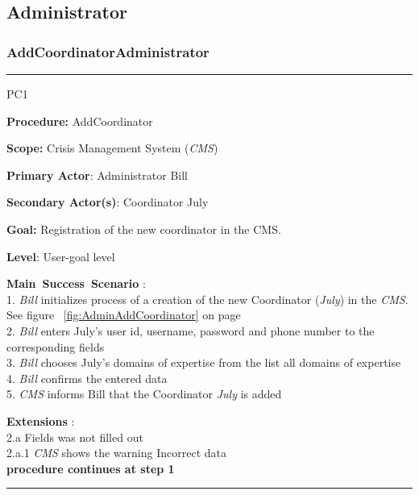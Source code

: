 \subsection{Administrator}

\subsubsection{AddCoordinatorAdministrator}

\vspace{0.5cm}
\hrule
\begin{lyxlist}{PC1}
\small{
\item [\textbf{Procedure:}] AddCoordinator
\item [\textbf{Scope:}] Crisis Management System (\emph{CMS})
\item [\textbf{Primary Actor}:] Administrator Bill
\item [\textbf{Secondary Actor(s)}:] Coordinator July
\item [\textbf{Goal:}] Registration of the new coordinator in the CMS.
\item [\textbf{Level}:] User-goal level
\item [\textbf{Main~Success~Scenario}]:\\
1. \emph{Bill} initializes process of a creation of the new Coordinator
(\emph{July}) in the \emph{CMS}. See figure ~\ref{fig:AdminAddCoordinator} on
page~\pageref{fig:AdminAddCoordinator}\\
2. \emph{Bill} enters July's user id, username, password and phone number to the
corresponding fields\\
3. \emph{Bill} chooses July's domains of expertise from the list all domains of
expertise\\
4. \emph{Bill} confirms the entered data\\
5. \emph{CMS} informs Bill that the Coordinator \emph{July} is added

\item [\textbf{Extensions}]:\\
2.a Fields was not filled out\\
\hspace*{0.5cm} 2.a.1 \emph{CMS} shows the warning Incorrect data\\
\hspace*{0.5cm} \textbf{procedure continues at step 1}

}
\end{lyxlist}
\hrule
\vspace{0.5cm}


